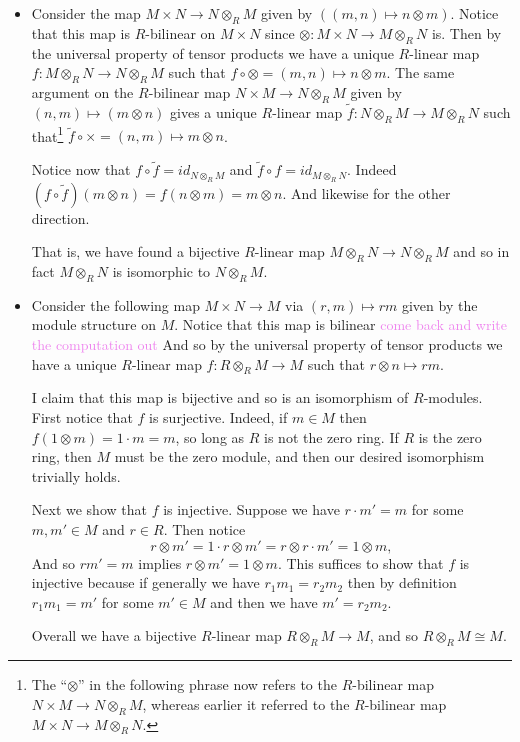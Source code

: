 \documentclass[12pt,letterpaper,boxed]{hmcpset}
\newcommand{\wg}[1]{\textcolor{violet}{#1}}
\begin{document}
\begin{solution}
\begin{itemize}
\item Consider the map $M \times N \to N \otimes_R M$ given by $((m,n)
\mapsto n \otimes m)$. Notice that this map is $R$-bilinear on $M \times
N$ since $\otimes: M \times N \to M \otimes_R N$ is.
Then by the universal property of tensor products we have a unique
$R$-linear map $f: M \otimes_R N \to N \otimes_R M$ such that $f \circ
\otimes = (m,n) \mapsto n \otimes m$. 
The same argument on the $R$-bilinear map $N \times M \to N \otimes_R
M$ given by $(n,m) \mapsto (m \otimes n)$ gives a unique $R$-linear
map $\tilde f: N \otimes_R M \to M \otimes_R N$ such that\footnote{
The ``$\otimes$'' in the following phrase now refers to the
$R$-bilinear map $N \times M \to N \otimes_R M$, whereas earlier it
referred to the $R$-bilinear map $M \times N \to M \otimes_R N$.
} $\tilde f
\circ \times = (n,m) \mapsto m \otimes n$. 

Notice now that $f \circ \tilde f = id_{N \otimes_R M}$ and $\tilde f
\circ f = id_{M \otimes_R N}$. Indeed $(f \circ \tilde f)(m \otimes n)
= f(n \otimes m) = m \otimes n$. And likewise for the other direction.

That is, we have found a bijective $R$-linear map $M \otimes_R N \to N
\otimes_R M$ and so in fact $M \otimes_R N$ is isomorphic to $N
\otimes_R M$.


\item Consider the following map $M \times N \to M$ via $(r,m) \mapsto
rm$ given by the module structure on $M$. Notice that this map is
bilinear \wg{come back and write the computation out}
And so by the universal property of tensor products we have a unique
$R$-linear map $f: R \otimes_R M \to M$ such that $r \otimes n
\mapsto rm$. 

I claim that this map is bijective and so is an isomorphism of
$R$-modules. First notice that $f$ is surjective. Indeed, if $m \in M$
then $f(1 \otimes m) = 1\cdot m = m$, so long as $R$ is not the zero
ring. If $R$ is the zero ring, then $M$ must be the zero module, and
then our desired isomorphism trivially holds. 

Next we show that $f$ is injective. 
Suppose we have $r \cdot m' = m$ for some $m,m' \in M$ and
$r \in R$. Then notice 
\[
	r \otimes m' = 1 \cdot r \otimes m' = r
		\otimes r \cdot m' = 1 \otimes m,
\]
And so $rm' = m$ implies $r \otimes m' = 1 \otimes m$. This suffices
to show that $f$ is injective because if generally we have $r_1 m_1 =
r_2 m_2$ then by definition $r_1 m_1 = m'$ for some $m' \in M$ and
then we have $m' = r_2 m_2$. 

Overall we have a bijective $R$-linear map $R \otimes_R M \to M$, and
so $R \otimes_R M \cong M$.


\end{itemize}
\end{solution}
\end{document}

